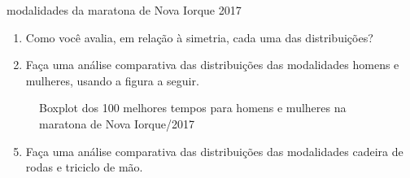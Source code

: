 \begin{task}{modalidades da maratona de Nova Iorque 2017}
\begin{enumerate}
\item {} 
Como você avalia, em relação à simetria, cada uma das distribuições?

\item {} 
Faça uma análise comparativa das distribuições das modalidades homens e mulheres, usando a figura a seguir.

\end{enumerate}

\begin{figure}[H]
\centering
\capstart

\noindent{}
\caption{Boxplot dos 100 melhores tempos para homens e mulheres na maratona de Nova Iorque/2017}\label{\detokenize{PE104-7:fig-boxplothm}}\label{\detokenize{PE104-7:id3}}\end{figure}
\begin{enumerate}
\setcounter{enumi}{4}
\item {} 
Faça uma análise comparativa das distribuições das modalidades cadeira de rodas e triciclo de mão.

\end{enumerate}
\end{task}

